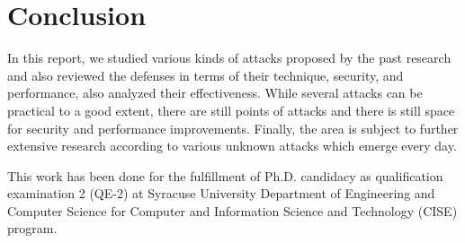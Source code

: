 \section{Conclusion}
In this report, we studied various kinds of attacks proposed by the past research and also reviewed the defenses in terms of their technique, security, and performance, also analyzed their effectiveness. While several attacks can be practical to a good extent, there are still points of attacks and there is still space for security and performance improvements. Finally, the area is subject to further extensive research according to various unknown attacks which emerge every day.

\begin{acks}
	
	This work has been done for the fulfillment of Ph.D. candidacy as qualification examination 2 (QE-2) at Syracuse University Department of Engineering and Computer Science for Computer and Information Science and Technology (CISE) program.
	
	
\end{acks}


